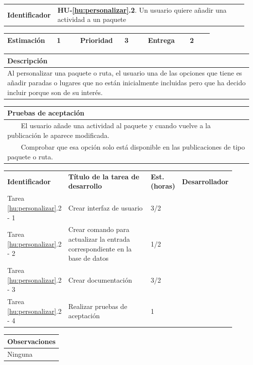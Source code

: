 \documentclass[11pt]{article}
\newcommand{\tabitem}{~~\llap{\textbullet}~~}
\begin{document}
\begin{longtable}{p{0.18\linewidth}|p{0.8\linewidth}}
  \rowcolor{LightCyan}
  \textbf{Identificador} & \textbf{{HU-\ref{hu:personalizar}.2}}. Un usuario quiere añadir una actividad a un paquete \\  
\end{longtable}
\vspace{-0.8cm}
\begin{longtable}{p{0.18\linewidth}|p{0.1\linewidth}|p{0.18\linewidth}|p{0.1\linewidth}|p{0.18\linewidth}|p{0.1\linewidth}}
  \toprule
  \textbf{Estimación} & 1 & \textbf{Prioridad} & 3 & \textbf{Entrega} & 2 \\
  \bottomrule
\end{longtable}
\vspace{-0.8cm}
\begin{longtable}{p{1.028\linewidth}}
  \textbf{Descripción}\\
  \midrule
  Al personalizar una paquete o ruta, el usuario una de las opciones que tiene es añadir paradas o lugares que no están inicialmente incluidas pero que ha decido incluir porque son de su interés. \\
  \bottomrule
\end{longtable}
\vspace{-0.8cm}
\begin{longtable}{p{1.028\linewidth}}
  \textbf{Pruebas de aceptación}\\
  \midrule
  \tabitem El usuario añade una actividad al paquete y cuando vuelve a la publicación le aparece modificada.\\
  \tabitem Comprobar que esa opción solo está disponible en las publicaciones de tipo paquete o ruta.\\
\end{longtable}
\vspace{-0.8cm}
\begin{longtable}{p{0.18\linewidth}|p{0.48\linewidth}|p{0.1\linewidth}|p{0.17\linewidth}}
  \toprule
  \textbf{Identificador} & \textbf{Título de la tarea de desarrollo} & \textbf{Est. (horas)} & \textbf{Desarrollador} \\
  Tarea \ref{hu:personalizar}.2 - 1 &Crear interfaz de usuario & 3/2 &\\
  Tarea \ref{hu:personalizar}.2 - 2 & Crear comando para  actualizar la entrada correspondiente en la base de datos  & 1/2 & \\
  Tarea \ref{hu:personalizar}.2 - 3 & Crear documentación & 3/2 & \\
  Tarea \ref{hu:personalizar}.2 - 4 & Realizar pruebas de aceptación & 1 &  \\
  \bottomrule
\end{longtable}
\vspace{-0.8cm}
\begin{longtable}{p{1.028\linewidth}}
  \textbf{Observaciones}\\
  \midrule
  Ninguna\\
  \bottomrule
\end{longtable}
\end{document}
